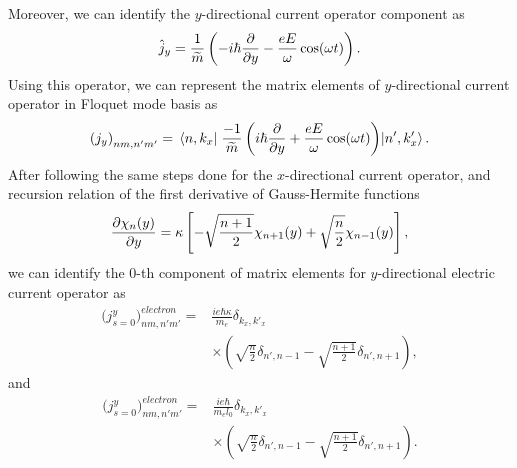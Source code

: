 \documentclass[
 reprint,
 amsmath,amssymb,
 aps,
 prb,
]{revtex4-2}
\begin{document}
{Moreover, we can identify the $y$-directional current operator component as
\begin{equation} \label{eq:d12}
  \hat{j}_y = \frac{1}{\widetilde{m}} \left(-i\hbar\pdv{y} - \frac{eE}{\omega}\cos(\omega t) \right).
\end{equation}
Using this operator, we can represent the matrix elements of $y$-directional current operator in Floquet mode basis as
\begin{equation} \label{eq:d13}
  \left({j}_y \right)_{nm,n'm'} =
  \mel{n,k_x}{\;\frac{-1}{\widetilde{m}} \left(i\hbar\pdv{y} + \frac{eE}{\omega}\cos(\omega t) \right)}{n',k'_x}.
\end{equation}
After following the same steps done for the $x$-directional current operator, and recursion relation of the first derivative of Gauss-Hermite functions \cite{boyd18}
\begin{equation} \label{eq:d14}
  \begin{aligned}
    \pdv{\chi_{n}({y})}{y} =
    \kappa\left[
    -  \sqrt{\frac{n+1}{2}} \chi_{n+1}({y})
    +  \sqrt{\frac{n}{2}} \chi_{n - 1}({y})
    \right],
  \end{aligned}
\end{equation}
we can identify the $0$-th component of matrix elements for $y$-directional electric current operator as
\begin{equation} \label{eq:d15}
  \begin{aligned}
    \Big({j}^y_{s=0}\Big)_{nm,n'm'}^{electron} = &
    \frac{ie\hbar\kappa}{{m_e}}
    \delta_{k_x,k'_x} \\
    & \times
    \left(
    \sqrt{\frac{n}{2}} \delta_{n',n-1}
    - \sqrt{\frac{n+1}{2}} \delta_{n',n+1}
    \right),
  \end{aligned}
\end{equation}
and
\begin{equation} \label{eq:d16}
  \begin{aligned}
    \Big({j}^y_{s=0}\Big)_{nm,n'm'}^{electron} = &
    \frac{ie\hbar}{{m_e}l_0}
    \delta_{k_x,k'_x} \\
    & \times
    \left(
    \sqrt{\frac{n}{2}} \delta_{n',n-1}
    - \sqrt{\frac{n+1}{2}} \delta_{n',n+1}
    \right).
  \end{aligned}
\end{equation}
}

\end{document}
